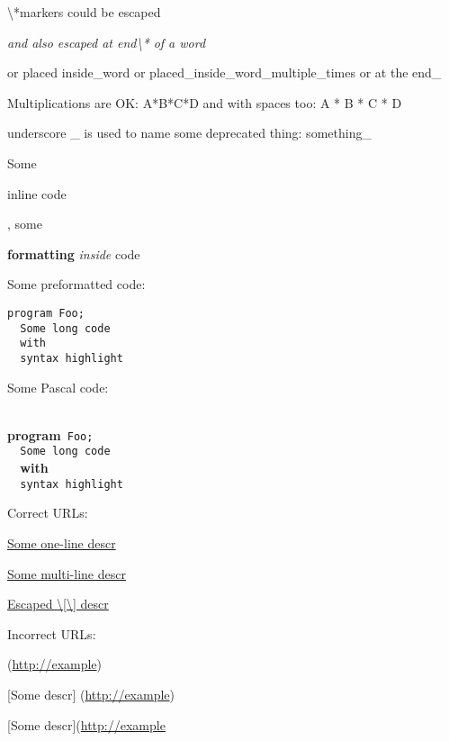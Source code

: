 \documentclass{report}
\begin{document}
{\textbackslash}*markers could be escaped

\textit{and also escaped at end{\textbackslash}* of a word}

or placed inside{\_}word or placed{\_}inside{\_}word{\_}multiple{\_}times or at the end{\_}

Multiplications are OK: A*B*C*D and with spaces too: A * B * C * D

underscore {\_} is used to name some deprecated thing: something{\_}

Some \begin{ttfamily}inline code\end{ttfamily}, some \begin{ttfamily}\textbf{formatting} \textit{inside} code\end{ttfamily}

Some preformatted code:

\begin{verbatim}
program Foo;
  Some long code
  with
  syntax highlight\end{verbatim}

Some Pascal code:

\texttt{\\\nopagebreak[3]
}\textbf{program}\texttt{~Foo;\\\nopagebreak[3]
~~Some~long~code\\\nopagebreak[3]
~~}\textbf{with}\texttt{\\\nopagebreak[3]
~~syntax~highlight\\
}

Correct URLs:

\href{http://example}{Some one-line descr}

\href{http://example}{Some multi-line
   descr}

\href{http://example}{Escaped {\textbackslash}[{\textbackslash}] descr}

Incorrect URLs:

(\href{http://example}{http://example})

[Some descr] (\href{http://example}{http://example})

[Some descr](\href{http://example}{http://example}
\end{document}
